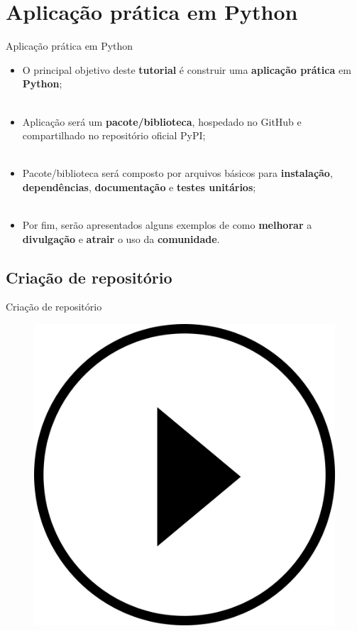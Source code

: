 \section{Aplicação prática em Python}
\label{s.python_application}

\begin{frame}{Aplicação prática em Python}
	\justify 
	\begin{itemize}
		\item<1> O principal objetivo deste \textbf{tutorial} é construir uma \textbf{aplicação prática} em \textbf{Python};
		\\~\\
		\item<2> Aplicação será um \textbf{pacote/biblioteca}, hospedado no GitHub e compartilhado no repositório oficial PyPI;
		\\~\\
		\item<3> Pacote/biblioteca será composto por arquivos básicos para \textbf{instalação}, \textbf{dependências}, \textbf{documentação} e \textbf{testes unitários};
		\\~\\
		\item<4> Por fim, serão apresentados alguns exemplos de como \textbf{melhorar} a \textbf{divulgação} e \textbf{atrair} o uso da \textbf{comunidade}.
	\end{itemize}
\end{frame}

\subsection{Criação de repositório}
\label{ss.repository_creation}

\begin{frame}{Criação de repositório}
	\begin{figure}
		\centering
		\includegraphics[scale=0.125]{figs/video_play.png}
	\end{figure}
\end{frame}

